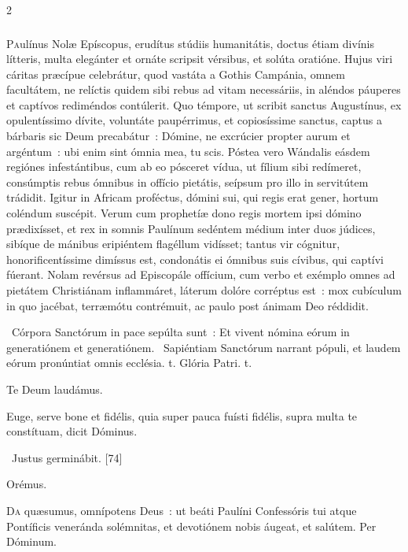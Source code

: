 \documentclass[9pt,twoside]{extarticle}
\begin{document}
\begin{multicols}{2}
\subsubsection*{\center {}}
\lettrine{P}aulínus Nolæ Epíscopus, erudítus stúdiis humanitátis, doctus étiam divínis lítteris, multa elegánter et ornáte scripsit vérsibus, et solúta oratióne. Hujus viri cáritas præcípue celebrátur, quod vastáta a Gothis Campánia, omnem facultátem, ne relíctis quidem sibi rebus ad vitam necessáriis, in aléndos páuperes et captívos rediméndos contúlerit. Quo témpore, ut scribit sanctus Augustínus, ex opulentíssimo dívite, voluntáte paupérrimus, et copiosíssime sanctus, captus a bárbaris sic Deum precabátur~: Dómine, ne excrúcier propter aurum et argéntum~: ubi enim sint ómnia mea, tu scis. Póstea vero Wándalis eásdem regiónes infestántibus, cum ab eo pósceret vídua, ut fílium sibi redímeret, consúmptis rebus ómnibus in offício pietátis, seípsum pro illo in servitútem trádidit. Igitur in Africam proféctus, dómini sui, qui regis erat gener, hortum coléndum suscépit. Verum cum prophetíæ dono regis mortem ipsi dómino prædixísset, et rex in somnis Paulínum sedéntem médium inter duos júdices, sibíque de mánibus eripiéntem flagéllum vidísset; tantus vir cógnitur, honorificentíssime dimíssus est, condonátis ei ómnibus suis cívibus, qui captívi fúerant. Nolam revérsus ad Episcopále offícium, cum verbo et exémplo omnes ad pietátem Christiánam inflammáret, láterum dolóre corréptus est~: mox cubículum in quo jacébat, terræmótu contrémuit, ac paulo post ánimam Deo réddidit.

\begin{tightlist}{}
\item {}~Córpora Sanctórum in pace sepúlta sunt~: \textred{*} Et vivent nómina eórum in generatiónem et generatiónem. 
~Sapiéntiam Sanctórum narrant pópuli, et laudem eórum pronúntiat omnis ecclésia. t. Glória Patri. t.
\item Te Deum laudámus.
\item {} Euge, serve bone et fidélis, quia super pauca fuísti fidélis, supra multa te constítuam, dicit Dóminus. 
\item {}~Justus germinábit. [74]
\item Orémus. \hfill {} 
\end{tightlist}
\lettrine{D}a quæsumus, omnípotens Deus~: ut beáti Paulíni Confessóris tui atque Pontíficis veneránda solémnitas, et devotiónem nobis áugeat, et salútem. Per Dóminum.


\end{multicols}
\end{document}
